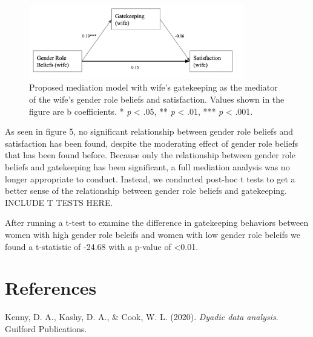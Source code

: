 \documentclass[
  man,floatsintext]{apa6}
\newlength{\cslhangindent}
\newlength{\cslentryspacingunit} %
\newenvironment{CSLReferences}[2] %
 {%
  \setlength{\parindent}{0pt}
  \ifodd #1
  \let\oldpar\par
  \def\par{\hangindent=\cslhangindent\oldpar}
  \fi
  \setlength{\parskip}{#2\cslentryspacingunit}
 }%
 {}
\begin{document}
\begin{figure}
\includegraphics[width=3.69in]{mediation} \caption{Proposed mediation model with wife's gatekeeping as the mediator of the wife's gender role beliefs and satisfaction. Values shown in the figure are b coefficients.
* \emph{p} \textless{} .05, ** \emph{p} \textless{} .01, *** \emph{p} \textless{} .001.}\label{fig:unnamed-chunk-18}
\end{figure}

As seen in figure 5, no significant relationship between gender role beliefs and satisfaction has been found, despite the moderating effect of gender role beliefs that has been found before. Because only the relationship between gender role beliefs and gatekeeping has been significant, a full mediation analysis was no longer appropriate to conduct.
Instead, we conducted post-hoc t tests to get a better sense of the relationship between gender role beliefs and gatekeeping. INCLUDE T TESTS HERE.

After running a t-test to examine the difference in gatekeeping behaviors between women with high gender role beleifs and women with low gender role beleifs we found a t-statistic of -24.68 with a p-value of \textless0.01.

\hypertarget{references}{%
\section{References}\label{references}}

\hypertarget{refs}{}
\begin{CSLReferences}{1}{0}
\leavevmode{}%
Kenny, D. A., Kashy, D. A., \& Cook, W. L. (2020). \emph{Dyadic data analysis}. Guilford Publications.

\end{CSLReferences}


\clearpage
\renewcommand{\listfigurename}{Figure captions}

\clearpage
\renewcommand{\listtablename}{Table captions}
\end{document}
